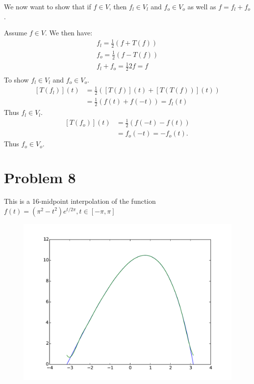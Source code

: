 \documentclass[paper=a4, fontsize=11pt]{scrartcl} %
\numberwithin{equation}{section} %
\numberwithin{figure}{section} %
\numberwithin{table}{section} %
\theoremstyle{definition}
\begin{document}
We now want to show that if $f \in V$, then $f_l \in V_l$ and $f_o \in V_o$ as well as $f = f_l + f_o$.

Assume $f \in V$. We then have:
\begin{align*}
  f_l = \frac{1}{2}\left( f + T\left( f \right) \right) \\
  f_o = \frac{1}{2}\left( f - T(f) \right)\\
  f_l + f_o = \frac{1}{2}2f = f\\
\end{align*}
To show $f_l \in V_l$ and $f_o \in V_o$.
\begin{align*}
  \left[ T(f_l) \right](t) &= \frac{1}{2}\left( \left[ T(f) \right](t) + \left[ T(T(f)) \right](t) \right)\\
  &= \frac{1}{2}\left( f(t) + f(-t) \right) = f_l(t)
\end{align*}
Thus $f_l \in V_l$.
\begin{align*}
  \left[ T(f_o) \right](t) &= \frac{1}{2}(f(-t) - f(t)) \\
  &= f_o(-t) = -f_o(t).
\end{align*}
Thus $f_o \in V_o$.

\pagebreak
\section*{Problem 8}
This is a 16-midpoint interpolation of the function $f(t) = \left(\pi^2 - t^2\right)e^{t/2\pi}, t \in \left[ -\pi, \pi \right]$
\begin{figure}[!h]
	\centering
	\includegraphics[scale=0.5]{Problem8}
\end{figure}
\end{document}

